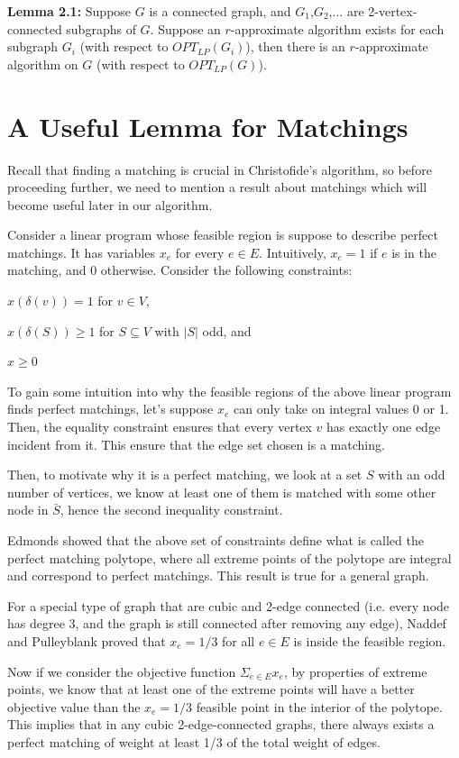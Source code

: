 \documentclass[12pt]{article}
\begin{document}
{\bf Lemma 2.1:} Suppose $G$ is a connected graph, and $G_1$,$G_2$,$\ldots$ are 2-vertex-connected subgraphs of $G$. Suppose an $r$-approximate algorithm exists for each subgraph $G_i$ (with respect to $OPT_{LP}(G_i)$), then there is an $r$-approximate algorithm on $G$ (with respect to $OPT_{LP}(G)$).

\section{A Useful Lemma for Matchings}

Recall that finding a matching is crucial in Christofide's algorithm, so before proceeding further, we need to mention a result about matchings which will become useful later in our algorithm.

Consider a linear program whose feasible region is suppose to describe perfect matchings. It has variables $x_e$ for every $e \in E$. Intuitively, $x_e = 1$ if $e$ is in the matching, and 0 otherwise. Consider the following constraints:

$x(\delta(v)) = 1$ for $v \in V$,

$x(\delta(S))\geq 1$ for $S \subseteq V$ with $|S|$ odd, and

$x \geq 0$

To gain some intuition into why the feasible regions of the above linear program finds perfect matchings, let's suppose $x_e$ can only take on integral values 0 or 1. Then, the equality constraint ensures that every vertex $v$ has exactly one edge incident from it. This ensure that the edge set chosen is a matching.

Then, to motivate why it is a perfect matching, we look at a set $S$ with an odd number of vertices, we know at least one of them is matched with some other node in $\bar{S}$, hence the second inequality constraint.

Edmonds showed that the above set of constraints define what is called the perfect matching polytope, where all extreme points of the polytope are integral and correspond to perfect matchings. This result is true for a general graph.

For a special type of graph that are cubic and 2-edge connected (i.e. every node has degree 3, and the graph is still connected after removing any edge), Naddef and Pulleyblank proved that $x_e = 1/3$ for all $e \in E$ is inside the feasible region.

Now if we consider the objective function $\Sigma_{e\in E}x_e$, by properties of extreme points, we know that at least one of the extreme points will have a better objective value than the $x_e = 1/3$ feasible point in the interior of the polytope. This implies that in any cubic 2-edge-connected graphs, there always exists a perfect matching of weight at least 1/3 of the total weight of edges.
\end{document}
